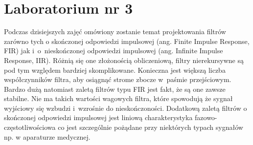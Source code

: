 \section{Laboratorium nr 3}

Podczas dzisiejszych zajęć omówiony zostanie temat projektowania filtrów zarówno tych o skończonej odpowiedzi impulsowej (ang. Finite Impulse Response, FIR) jak i~o~nieskończonej odpowiedzi impulsowej (ang. Infinite Impulse Response, IIR). Różnią się one złożonością obliczeniową, filtry nierekursywne są pod tym względem bardziej skomplikowane. Konieczna jest większą liczba współczynników filtra, aby osiągnąć strome zbocze w~paśmie przejściowym. Bardzo dużą natomiast zaletą filtrów typu FIR jest fakt, że są one zawsze stabilne. Nie ma takich wartości wagowych filtra, które spowodują że sygnał wyjściowy się wzbudzi i~wzrośnie do nieskończoności. Dodatkową zaletą filtrów o skończonej odpowiedzi impulsowej jest liniową charakterystyka fazowo-częstotliwościowa co jest szczególnie pożądane przy niektórych typach sygnałów np. w aparaturze medycznej. 

